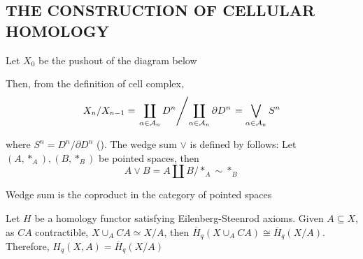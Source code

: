 \documentclass{report}
\begin{document}
\subsection{THE CONSTRUCTION OF CELLULAR HOMOLOGY}

Let $X_0$ be the pushout of the diagram below
\begin{center}
\end{center}

Then, from the definition of cell complex,
$$
    X_n / X_{n-1} = \left. \coprod_{\alpha \in \mathcal{A}_n} D^n \middle/ \coprod_{\alpha \in \mathcal{A}_n} \partial D^n \right. = \bigvee_{\alpha \in \mathcal{A}_n} S^n
$$

where $S^n = D^n / \partial D^n$ (). The wedge sum $\vee$ is defined by follows: Let $(A, *_A), (B, *_B)$ be pointed spaces, then
$$
    A \vee B = A \amalg B / *_A \sim *_B
$$

\begin{remark}
    Wedge sum is the coproduct in the category of pointed spaces
\end{remark}

Let $H$ be a homology functor satisfying Eilenberg-Steenrod axioms. Given $A \subseteq X$, as $CA$ contractible, $X \cup_A CA \simeq X / A$, then $\overline{H}_q(X \cup_A CA) \cong \overline{H}_q(X / A)$. Therefore, $H_q(X, A) = \overline{H}_q(X / A)$

\begin{center}
\end{center}
\end{document}
